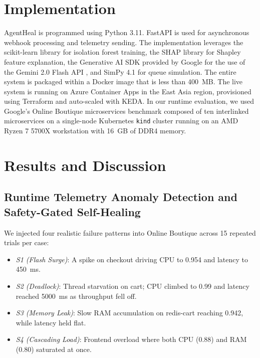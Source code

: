 \documentclass[10pt,conference]{IEEEtran}
\begin{document}
\section{Implementation}

AgentHeal is programmed using Python 3.11. FastAPI is used for asynchronous webhook processing and telemetry sending. The implementation leverages the scikit-learn library for isolation forest training, the SHAP library for Shapley feature explanation, the Generative AI SDK provided by Google for the use of the Gemini 2.0 Flash API \cite{gemini2}, and SimPy 4.1 for queue simulation. The entire system is packaged within a Docker image that is less than 400~MB. The live system is running on Azure Container Apps in the East Asia region, provisioned using Terraform and auto-scaled with KEDA. In our runtime evaluation, we used Google's Online Boutique microservices benchmark \cite{onlineboutique} composed of ten interlinked microservices on a single-node Kubernetes \texttt{kind} cluster running on an AMD Ryzen 7 5700X workstation with 16~GB of DDR4 memory.

\section{Results and Discussion}

\subsection{Runtime Telemetry Anomaly Detection and Safety-Gated Self-Healing}

We injected four realistic failure patterns into Online Boutique across 15 repeated trials per case:
\begin{itemize}
\item \textit{S1 (Flash Surge)}: A spike on checkout driving CPU to 0.954 and latency to 450~ms.
\item \textit{S2 (Deadlock)}: Thread starvation on cart; CPU climbed to 0.99 and latency reached 5000~ms as throughput fell off.
\item \textit{S3 (Memory Leak)}: Slow RAM accumulation on redis-cart reaching 0.942, while latency held flat.
\item \textit{S4 (Cascading Load)}: Frontend overload where both CPU (0.88) and RAM (0.80) saturated at once.
\end{itemize}
\end{document}
